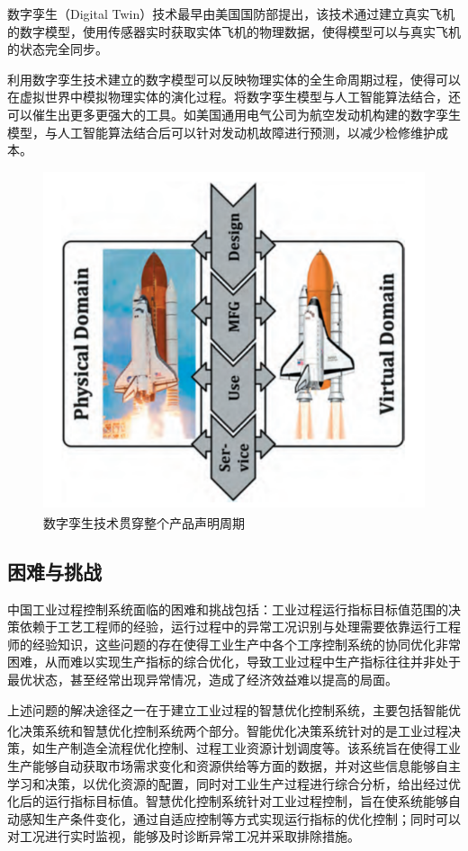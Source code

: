 \documentclass{my_class}
\begin{document}
数字孪生（Digital Twin）技术最早由美国国防部提出，该技术通过建立真实飞机的数字模型，使用传感器实时获取实体飞机的物理数据，使得模型可以与真实飞机的状态完全同步。

利用数字孪生技术建立的数字模型可以反映物理实体的全生命周期过程，使得可以在虚拟世界中模拟物理实体的演化过程。将数字孪生模型与人工智能算法结合，还可以催生出更多更强大的工具。如美国通用电气公司为航空发动机构建的数字孪生模型，与人工智能算法结合后可以针对发动机故障进行预测，以减少检修维护成本。

\begin{figure}[H]
    \centering %
    \includegraphics[width=.6\textwidth]{figure/数字孪生技术贯穿整个产品声明周期.png} 
    \caption{数字孪生技术贯穿整个产品声明周期\textsuperscript{\cite{GZDI202005001}}} %
\end{figure}

\subsection{困难与挑战}
中国工业过程控制系统面临的困难和挑战包括：工业过程运行指标目标值范围的决策依赖于工艺工程师的经验，运行过程中的异常工况识别与处理需要依靠运行工程师的经验知识，这些问题的存在使得工业生产中各个工序控制系统的协同优化非常困难，从而难以实现生产指标的综合优化，导致工业过程中生产指标往往并非处于最优状态，甚至经常出现异常情况，造成了经济效益难以提高的局面。

上述问题的解决途径之一在于建立工业过程的智慧优化控制系统，主要包括智能优化决策系统\textsuperscript{\cite{MOTO201811002}}和智慧优化控制系统两个部分。智能优化决策系统针对的是工业过程决策，如生产制造全流程优化控制、过程工业资源计划调度等。该系统旨在使得工业生产能够自动获取市场需求变化和资源供给等方面的数据，并对这些信息能够自主学习和决策，以优化资源的配置，同时对工业生产过程进行综合分析，给出经过优化后的运行指标目标值。智慧优化控制系统针对工业过程控制，旨在使系统能够自动感知生产条件变化，通过自适应控制等方式实现运行指标的优化控制；同时可以对工况进行实时监视，能够及时诊断异常工况并采取排除措施。
\end{document}
